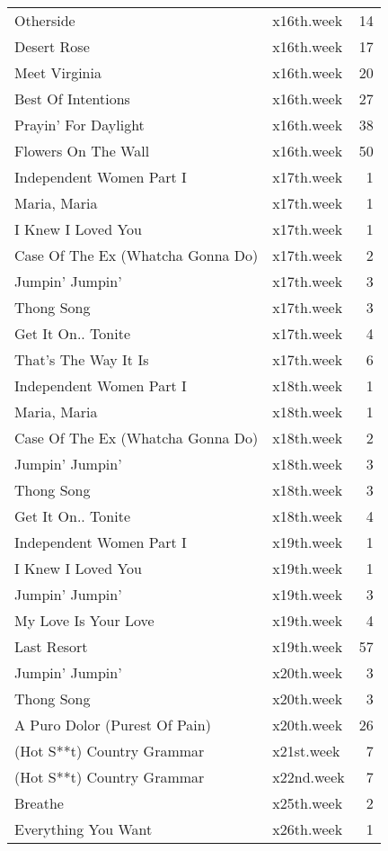 \begin{table}[ht]
\begin{tabular}{llr}
  Otherside & x16th.week &  14 \\ 
  Desert Rose & x16th.week &  17 \\ 
  Meet Virginia & x16th.week &  20 \\ 
  Best Of Intentions & x16th.week &  27 \\ 
  Prayin' For Daylight & x16th.week &  38 \\ 
  Flowers On The Wall & x16th.week &  50 \\ 
  Independent Women Part I & x17th.week &   1 \\ 
  Maria, Maria & x17th.week &   1 \\ 
  I Knew I Loved You & x17th.week &   1 \\ 
  Case Of The Ex (Whatcha Gonna Do) & x17th.week &   2 \\ 
  Jumpin' Jumpin' & x17th.week &   3 \\ 
  Thong Song & x17th.week &   3 \\ 
  Get It On.. Tonite & x17th.week &   4 \\ 
  That's The Way It Is & x17th.week &   6 \\ 
  Independent Women Part I & x18th.week &   1 \\ 
  Maria, Maria & x18th.week &   1 \\ 
  Case Of The Ex (Whatcha Gonna Do) & x18th.week &   2 \\ 
  Jumpin' Jumpin' & x18th.week &   3 \\ 
  Thong Song & x18th.week &   3 \\ 
  Get It On.. Tonite & x18th.week &   4 \\ 
  Independent Women Part I & x19th.week &   1 \\ 
  I Knew I Loved You & x19th.week &   1 \\ 
  Jumpin' Jumpin' & x19th.week &   3 \\ 
  My Love Is Your Love & x19th.week &   4 \\ 
  Last Resort & x19th.week &  57 \\ 
  Jumpin' Jumpin' & x20th.week &   3 \\ 
  Thong Song & x20th.week &   3 \\ 
  A Puro Dolor (Purest Of Pain) & x20th.week &  26 \\ 
  (Hot S**t) Country Grammar & x21st.week &   7 \\ 
  (Hot S**t) Country Grammar & x22nd.week &   7 \\ 
  Breathe & x25th.week &   2 \\ 
  Everything You Want & x26th.week &   1 \\ 

\end{tabular}
\end{table}
